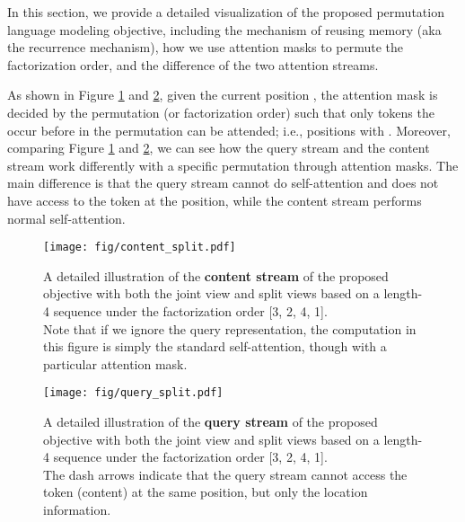 \documentclass{article}
\begin{document}
In this section, we provide a detailed visualization of the proposed permutation language modeling objective, including the mechanism of reusing memory (aka the recurrence mechanism), how we use attention masks to permute the factorization order, and the difference of the two attention streams. 


As shown in Figure \ref{fig:vis_content} and \ref{fig:vis_query}, given the current position , the attention mask is decided by the permutation (or factorization order)  such that only tokens the occur before  in the permutation can be attended; i.e., positions  with . Moreover, comparing Figure \ref{fig:vis_content} and \ref{fig:vis_query}, we can see how the query stream and the content stream work differently with a specific permutation through attention masks. The main difference is that the query stream cannot do self-attention and does not have access to the token at the position, while the content stream performs normal self-attention.


\begin{figure}
	\centering
	\texttt{[image: fig/content\_split.pdf]}
	\caption{A detailed illustration of the \textbf{content stream} of the proposed objective with both the joint view and split views based on a length-4 sequence under the factorization order [3, 2, 4, 1].
		\\
		Note that if we ignore the query representation, the computation in this figure is simply the standard self-attention, though with a particular attention mask.}
	\label{fig:vis_content}
\end{figure}

\begin{figure}
	\centering
	\texttt{[image: fig/query\_split.pdf]}
	\caption{A detailed illustration of the \textbf{query stream} of the proposed objective with both the joint view and split views based on a length-4 sequence under the factorization order [3, 2, 4, 1].
		\\
		The dash arrows indicate that the query stream cannot access the token (content) at the same position, but only the location information.}
	\label{fig:vis_query}
\end{figure}
 
\end{document}
